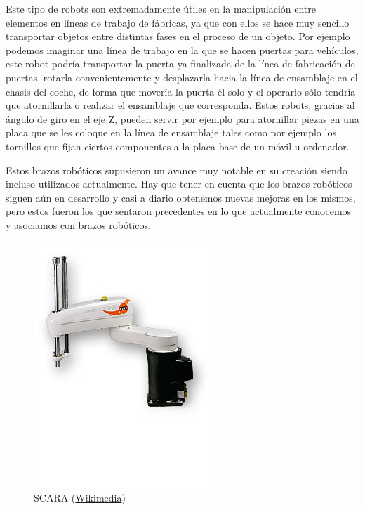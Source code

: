 \vspace{10px}

Este tipo de robots son extremadamente útiles en la manipulación entre elementos en líneas de trabajo de fábricas, ya que con ellos se hace muy sencillo transportar objetos entre distintas fases en el proceso de un objeto. Por ejemplo podemos imaginar una línea de trabajo en la que se hacen puertas para vehículos, este robot podría transportar la puerta ya finalizada de la línea de fabricación de puertas, rotarla convenientemente y desplazarla hacia la línea de ensamblaje en el chasis del coche, de forma que movería la puerta él solo y el operario sólo tendría que atornillarla o realizar el ensamblaje que corresponda. Estos robots, gracias al ángulo de giro en el eje Z, pueden servir por ejemplo para atornillar piezas en una placa que se les coloque en la línea de ensamblaje tales como por ejemplo los tornillos que fijan ciertos componentes a la placa base de un móvil u ordenador.

\vspace{10px}

Estos brazos robóticos supusieron un avance muy notable en su creación siendo incluso utilizados actualmente. Hay que tener en cuenta que los brazos robóticos siguen aún en desarrollo y casi a diario obtenemos nuevas mejoras en los mismos, pero estos fueron los que sentaron precedentes en lo que actualmente conocemos y asociamos con brazos robóticos.

\begin{figure}[!h]
	\centering
	\includegraphics[scale=0.5]{./EtapaModerna/Imagenes/SCARA.jpg}
	\caption{SCARA (\href{https://commons.wikimedia.org/wiki/File:KUKA_Industrial_Robot_KR10_SCARA.jpg}{Wikimedia})}
	\label{fig:scara}
\end{figure}
